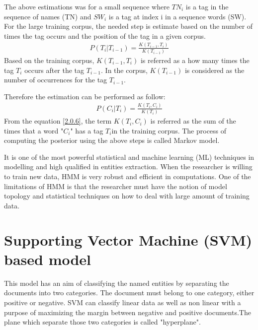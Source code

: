 The above estimations was for a small sequence where ${TN}_{i}$ is a tag in the sequence of names (TN) and ${SW}_{i}$ is a tag at index i in a sequence words (SW). For the large training corpus, the needed step is estimate based on the number of times the tag occurs and the position of the tag in a given corpus.
\begin{align}
P(T_{i}|T_{i-1}) = \frac{K(T_{i-1},T_{i})}{K(T_{i-1})}\label{2.0.5}
\end{align}
Based on the training corpus, $K(T_{i-1},T_{i})$ is referred as a how many times the tag $T_{i}$ occurs after the tag $T_{i-1}$. In the corpus, $K(T_{i-1})$ is considered as the number of occurrences for the tag $T_{i-1}$.

Therefore the estimation can be performed as follow:
\begin{align}
P(C_{i}|T_{i}) =  \frac{K(T_{i},C_{i})}{K(T_{i})} \label{2.0.6}
\end{align}
From the equation \eqref{2.0.6}, the term $K(T_{i},C_{i})$  is referred as the sum of the times that a word "$C_{i}$" has a tag $T_{i}$in the training corpus.
The process of computing the posterior using the above steps is called Markov model.


It is one of the most powerful statistical and machine learning (ML) techniques in modelling and high qualified in entities extraction. When the researcher is willing to train new data, HMM is very robust and efficient in computations.
One of the limitations of HMM is that the researcher must have the notion of model topology and statistical techniques on how to deal with large amount of training data.
\section{Supporting Vector Machine (SVM) based model}
This model has an aim of classifying the named entities by separating the documents into two categories.  The document must belong to one category, either positive or negative.  SVM can classify linear data as well as non linear with a purpose of maximizing the margin between negative and positive documents.The plane which separate those two categories is called "hyperplane".

